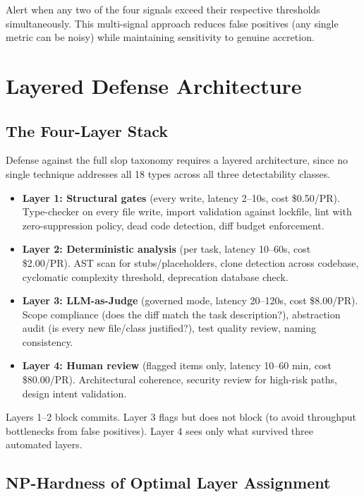 \documentclass[11pt, a4paper, copyright]{googledeepmind}
\begin{document}
Alert when any two of the four signals exceed their respective thresholds simultaneously. This multi-signal approach reduces false positives (any single metric can be noisy) while maintaining sensitivity to genuine accretion.


\section{Layered Defense Architecture}
\label{sec:defense}

\subsection{The Four-Layer Stack}

Defense against the full slop taxonomy requires a layered architecture, since no single technique addresses all 18 types across all three detectability classes.

\begin{itemize}[nosep]
    \item \textbf{Layer 1: Structural gates} (every write, latency 2--10s, cost \$0.50/PR). Type-checker on every file write, import validation against lockfile, lint with zero-suppression policy, dead code detection, diff budget enforcement.
    \item \textbf{Layer 2: Deterministic analysis} (per task, latency 10--60s, cost \$2.00/PR). AST scan for stubs/placeholders, clone detection across codebase, cyclomatic complexity threshold, deprecation database check.
    \item \textbf{Layer 3: LLM-as-Judge} (governed mode, latency 20--120s, cost \$8.00/PR). Scope compliance (does the diff match the task description?), abstraction audit (is every new file/class justified?), test quality review, naming consistency.
    \item \textbf{Layer 4: Human review} (flagged items only, latency 10--60 min, cost \$80.00/PR). Architectural coherence, security review for high-risk paths, design intent validation.
\end{itemize}

Layers 1--2 block commits. Layer 3 flags but does not block (to avoid throughput bottlenecks from false positives). Layer 4 sees only what survived three automated layers.

\subsection{NP-Hardness of Optimal Layer Assignment}
\end{document}
